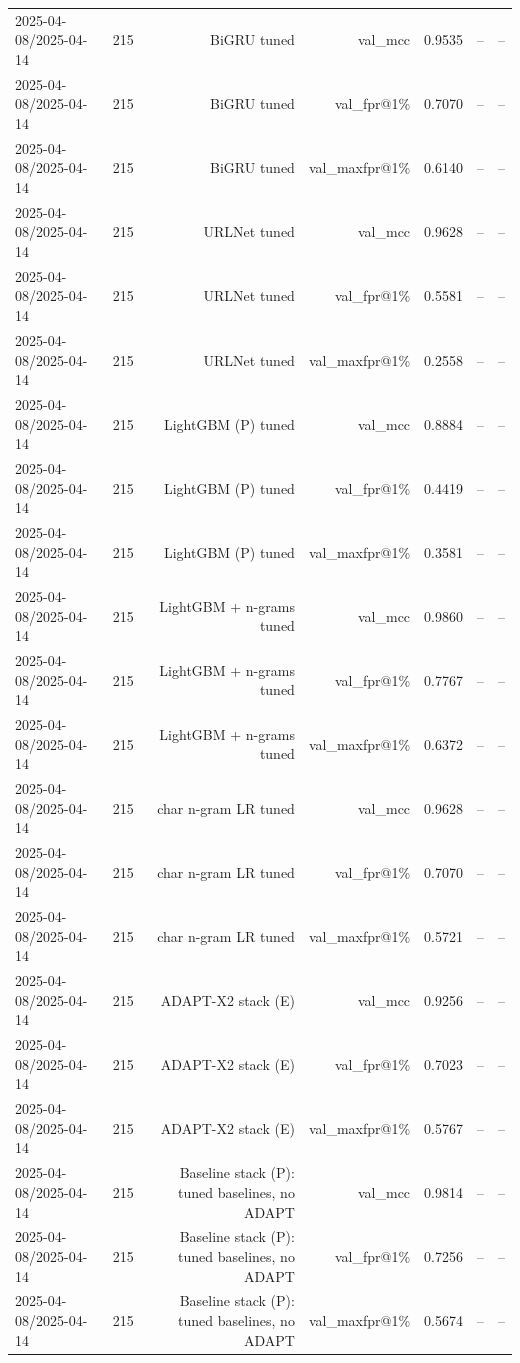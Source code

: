\begin{table}[t]
\begin{tabular}{llrrrrr}
2025-04-08/2025-04-14 & 215 & BiGRU tuned & val\_mcc & 0.9535 & -- & -- \\
2025-04-08/2025-04-14 & 215 & BiGRU tuned & val\_fpr@1\% & 0.7070 & -- & -- \\
2025-04-08/2025-04-14 & 215 & BiGRU tuned & val\_maxfpr@1\% & 0.6140 & -- & -- \\
2025-04-08/2025-04-14 & 215 & URLNet tuned & val\_mcc & 0.9628 & -- & -- \\
2025-04-08/2025-04-14 & 215 & URLNet tuned & val\_fpr@1\% & 0.5581 & -- & -- \\
2025-04-08/2025-04-14 & 215 & URLNet tuned & val\_maxfpr@1\% & 0.2558 & -- & -- \\
2025-04-08/2025-04-14 & 215 & LightGBM (P) tuned & val\_mcc & 0.8884 & -- & -- \\
2025-04-08/2025-04-14 & 215 & LightGBM (P) tuned & val\_fpr@1\% & 0.4419 & -- & -- \\
2025-04-08/2025-04-14 & 215 & LightGBM (P) tuned & val\_maxfpr@1\% & 0.3581 & -- & -- \\
2025-04-08/2025-04-14 & 215 & LightGBM + n-grams tuned & val\_mcc & 0.9860 & -- & -- \\
2025-04-08/2025-04-14 & 215 & LightGBM + n-grams tuned & val\_fpr@1\% & 0.7767 & -- & -- \\
2025-04-08/2025-04-14 & 215 & LightGBM + n-grams tuned & val\_maxfpr@1\% & 0.6372 & -- & -- \\
2025-04-08/2025-04-14 & 215 & char n-gram LR tuned & val\_mcc & 0.9628 & -- & -- \\
2025-04-08/2025-04-14 & 215 & char n-gram LR tuned & val\_fpr@1\% & 0.7070 & -- & -- \\
2025-04-08/2025-04-14 & 215 & char n-gram LR tuned & val\_maxfpr@1\% & 0.5721 & -- & -- \\
2025-04-08/2025-04-14 & 215 & ADAPT-X2 stack (E) & val\_mcc & 0.9256 & -- & -- \\
2025-04-08/2025-04-14 & 215 & ADAPT-X2 stack (E) & val\_fpr@1\% & 0.7023 & -- & -- \\
2025-04-08/2025-04-14 & 215 & ADAPT-X2 stack (E) & val\_maxfpr@1\% & 0.5767 & -- & -- \\
2025-04-08/2025-04-14 & 215 & Baseline stack (P): tuned baselines, no ADAPT & val\_mcc & 0.9814 & -- & -- \\
2025-04-08/2025-04-14 & 215 & Baseline stack (P): tuned baselines, no ADAPT & val\_fpr@1\% & 0.7256 & -- & -- \\
2025-04-08/2025-04-14 & 215 & Baseline stack (P): tuned baselines, no ADAPT & val\_maxfpr@1\% & 0.5674 & -- & -- \\

\end{tabular}
\end{table}

